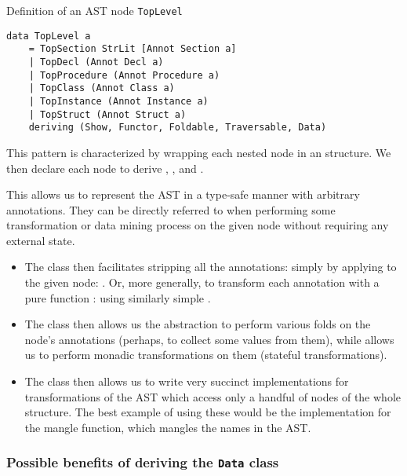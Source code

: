 \begin{listing}
    \caption{Definition of an AST node \texttt{TopLevel}}
    \label{lst:topLevel}
    \begin{lstlisting}[style=haskellStyle]
data TopLevel a
    = TopSection StrLit [Annot Section a]
    | TopDecl (Annot Decl a)
    | TopProcedure (Annot Procedure a)
    | TopClass (Annot Class a)
    | TopInstance (Annot Instance a)
    | TopStruct (Annot Struct a)
    deriving (Show, Functor, Foldable, Traversable, Data)
    \end{lstlisting}
\end{listing}

This pattern is characterized by wrapping each nested node  in an  structure. We then declare each node to derive , ,  and .

This allows us to represent the AST in a type-safe manner with arbitrary annotations. They can be directly referred to when performing some transformation or data mining process on the given node without requiring any external state.

\begin{itemize}
    \item The  class then facilitates stripping all the annotations: simply by applying  to the given node: . Or, more generally, to transform each annotation with a pure function : using similarly simple .

    \item The  class then allows us the abstraction to perform various folds on the node's annotations (perhaps, to collect some values from them), while  allows us to perform monadic transformations on them (stateful transformations).

    \item The  class then allows us to write very succinct implementations for transformations of the AST which access only a handful of nodes of the whole structure. The best example of using these would be the implementation for the mangle function, which mangles the names in the AST.
\end{itemize}

\subsubsection{Possible benefits of deriving the \texttt{Data} class}

